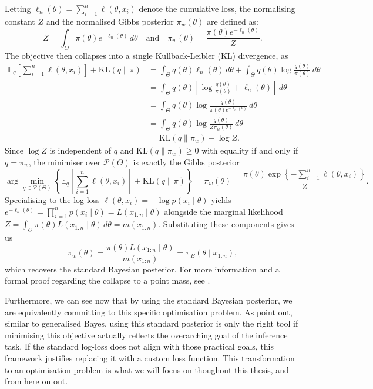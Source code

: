 \documentclass[mstat,12pt]{unswthesis}
\begin{document}
Letting $\ell_n(\theta) = \sum_{i=1}^{n}\ell(\theta,x_i)$ denote the cumulative loss, the normalising constant $Z$ and the normalised Gibbs posterior $\pi_w(\theta)$ are defined as:
$$
    Z = \int_{\Theta} \pi(\theta)e^{-\ell_n(\theta)}\,d\theta \quad \text{and} \quad \pi_w(\theta) = \frac{\pi(\theta)e^{-\ell_n(\theta)}}{Z}.
$$
The objective then collapses into a single Kullback-Leibler (KL) divergence, as
$$
    \begin{aligned}
        \mathbb{E}_{q}\left[\sum_{i=1}^{n}\ell(\theta,x_i)\right] + \mathrm{KL}(q \| \pi)
         & = \int_{\Theta} q(\theta)\ell_n(\theta)\,d\theta + \int_{\Theta} q(\theta)\log\frac{q(\theta)}{\pi(\theta)}\,d\theta \\
         & = \int_{\Theta} q(\theta)\left[\log\frac{q(\theta)}{\pi(\theta)} + \ell_n(\theta)\right]\,d\theta                    \\
         & = \int_{\Theta} q(\theta)\log\frac{q(\theta)}{\pi(\theta)e^{-\ell_n(\theta)}}\,d\theta                               \\
         & = \int_{\Theta} q(\theta)\log\frac{q(\theta)}{Z\pi_w(\theta)}\,d\theta                                               \\
         & = \mathrm{KL}(q \| \pi_w) - \log Z.
    \end{aligned}
$$
Since $\log Z$ is independent of $q$ and $\mathrm{KL}(q \| \pi_w) \ge 0$ with equality if and only if $q = \pi_w$, the minimiser over $\mathcal{P}(\Theta)$ is exactly the Gibbs posterior
$$
    \arg\min_{q \in \mathcal{P}(\Theta)}\left\{\mathbb{E}_{q}\left[\sum_{i=1}^{n}\ell(\theta,x_i)\right] + \mathrm{KL}(q \| \pi)\right\} = \pi_w(\theta) = \frac{\pi(\theta)\exp\left\{-\sum_{i=1}^{n}\ell(\theta,x_i)\right\}}{Z}.
$$
Specialising to the log-loss $\ell(\theta,x_i) = -\log p(x_i\mid\theta)$ yields $e^{-\ell_n(\theta)} = \prod_{i=1}^{n} p(x_i\mid\theta) = L(x_{1:n}\mid\theta)$ alongside the marginal likelihood $Z = \int_{\Theta}\pi(\theta)L(x_{1:n}\mid\theta)\,d\theta = m(x_{1:n})$. Substituting these components gives us
$$
    \pi_w(\theta) = \frac{\pi(\theta)L(x_{1:n}\mid\theta)}{m(x_{1:n})} = \pi_B(\theta \mid x_{1:n}),
$$
which recovers the standard Bayesian posterior. For more information and a formal proof regarding the collapse to a point mass, see \citet{knoblauch2022optimization}.

Furthermore, we can see now that by using the standard Bayesian posterior, we are equivalently committing to this specific optimisation problem. As \citet{knoblauch2022optimization} point out, similar to generalised Bayes, using this standard posterior is only the right tool if minimising this objective actually reflects the overarching goal of the inference task. If the standard log-loss does not align with those practical goals, this framework justifies replacing it with a custom loss function. This transformation to an optimisation problem is what we will focus on thoughout this thesis, and from here on out.
\end{document}
